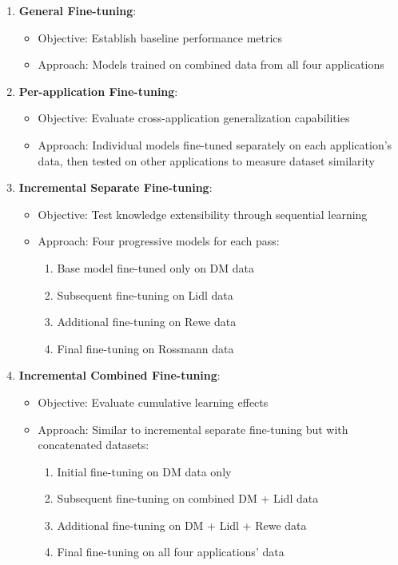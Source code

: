 \documentclass[licencjacka,en]{pracamgr}
\begin{document}
\begin{enumerate}
    \item \textbf{General Fine-tuning}:
    \begin{itemize}
        \item Objective: Establish baseline performance metrics
        \item Approach: Models trained on combined data from all four applications
    \end{itemize}

    \item \textbf{Per-application Fine-tuning}:
    \begin{itemize}
        \item Objective: Evaluate cross-application generalization capabilities
        \item Approach: Individual models fine-tuned separately on each application's data, then tested on other applications to measure dataset similarity
    \end{itemize}

    \item \textbf{Incremental Separate Fine-tuning}:
    \begin{itemize}
        \item Objective: Test knowledge extensibility through sequential learning
        \item Approach: Four progressive models for each pass:
        \begin{enumerate}
            \item Base model fine-tuned only on DM data
            \item Subsequent fine-tuning on Lidl data
            \item Additional fine-tuning on Rewe data
            \item Final fine-tuning on Rossmann data
        \end{enumerate}
    \end{itemize}

    \item \textbf{Incremental Combined Fine-tuning}:
    \begin{itemize}
        \item Objective: Evaluate cumulative learning effects
        \item Approach: Similar to incremental separate fine-tuning but with concatenated datasets:
        \begin{enumerate}
            \item Initial fine-tuning on DM data only
            \item Subsequent fine-tuning on combined DM + Lidl data
            \item Additional fine-tuning on DM + Lidl + Rewe data
            \item Final fine-tuning on all four applications' data
        \end{enumerate}
    \end{itemize}
\end{enumerate}
\end{document}
